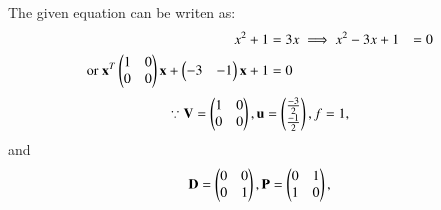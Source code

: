The given equation can be writen as:
\begin{align}
    x^2+1&=3x
\implies     x^2-3x+1&=0 \label{quadform/43/a/eq:2}
    \\
\text{or }\mathbf{x}^T\begin{pmatrix}1&0\\0&0\end{pmatrix}\mathbf{x}+\begin{pmatrix}-3&-1\end{pmatrix}\mathbf{x}+1&=0
\end{align}
\begin{align}
\because \mathbf{V} = \begin{pmatrix}1 & 0 \\ 0 & 0\end{pmatrix},\mathbf{u}=\begin{pmatrix}\frac{-3}{2} \\ \frac{-1}{2}\end{pmatrix}, f=1,
\end{align}
and
\begin{align}
\mathbf{D} = \begin{pmatrix}0 & 0\\0 & 1\end{pmatrix} ,\mathbf{P}=\begin{pmatrix}0 & 1\\1 & 0\end{pmatrix},
\end{align}

